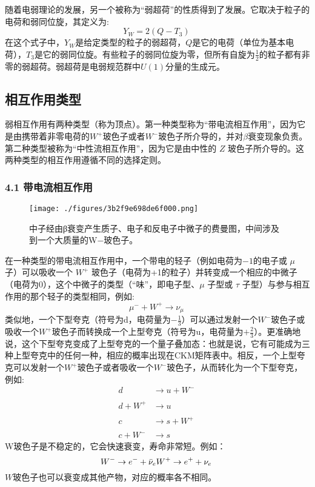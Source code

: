 随着电弱理论的发展，另一个被称为“弱超荷”的性质得到了发展。它取决于粒子的电荷和弱同位旋，其定义为:
$$Y_{W}=2(Q-T_{3})~$$
在这个式子中，$Y_{W}$是给定类型的粒子的弱超荷，$Q$是它的电荷（单位为基本电荷），$T_{3}$是它的弱同位旋。有些粒子的弱同位旋为零，但所有自旋为$\frac{1}{2}$的粒子都有非零的弱超荷。弱超荷是电弱规范群中$U(1)$分量的生成元。

\subsection{ 相互作用类型}
弱相互作用有两种类型（称为顶点）。第一种类型称为“带电流相互作用”，因为它是由携带着非零电荷的$W^{+}$玻色子或者$W^{-}$玻色子所介导的，并对$\beta$衰变现象负责。第二种类型被称为“中性流相互作用”，因为它是由中性的 $Z$ 玻色子所介导的。这两种类型的相互作用遵循不同的选择定则。

\subsubsection{4.1 带电流相互作用}
\begin{figure}[ht]
\centering
\texttt{[image: ./figures/3b2f9e698de6f000.png]}
\caption{中子经由β衰变产生质子、电子和反电子中微子的费曼图，中间涉及到一个大质量的W−玻色子。} \label{fig_RXHZY_6}
\end{figure}

在一种类型的带电流相互作用中，一个带电的轻子（例如电荷为$-1$的电子或 $\mu$ 子）可以吸收一个 $W^+$ 玻色子（电荷为+1的粒子）并转变成一个相应的中微子（电荷为$0$），这个中微子的类型（“味”，即电子型、$\mu$ 子型或 $\tau$ 子型）与参与相互作用的那个轻子的类型相同，例如:
$$\mu^- + W^+ \rightarrow \nu_\mu~$$
类似地，一个下型夸克（符号为d，电荷量为$-\frac{1}{3}$）可以通过发射一个$W^-$玻色子或吸收一个$W^+$玻色子而转换成一个上型夸克（符号为u，电荷量为$+\frac{2}{3}$）。更准确地说，这个下型夸克变成了上型夸克的一个量子叠加态：也就是说，它有可能成为三种上型夸克中的任何一种，相应的概率出现在CKM矩阵表中。相反，一个上型夸克可以发射一个$W^+$玻色子或者吸收一个$W^-$玻色子，从而转化为一个下型夸克，例如:
\begin{equation}
\begin{aligned}
d &\rightarrow u + W^{-} \\\\
d + W^{+} &\rightarrow u \\\\
c &\rightarrow s + W^{+} \\\\
c + W^{-} &\rightarrow s
\end{aligned}~
\end{equation}
W玻色子是不稳定的，它会快速衰变，寿命非常短。例如：
$$W^- \to e^- + \bar{\nu}_e \\\\
W^+ \to e^+ + \nu_e~$$
$W$玻色子也可以衰变成其他产物，对应的概率各不相同。

